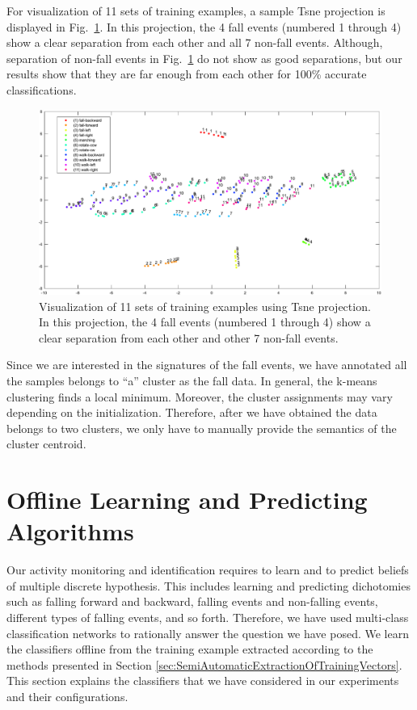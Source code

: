 \documentclass[]{IEEEtran}
\begin{document}
\par
For visualization of 11 sets of training examples, a sample Tsne projection  is displayed in Fig.~\ref{fig:automatic_annotation3}. In this projection, the 4 fall events (numbered 1 through 4) show a clear separation from each other and all 7 non-fall events. Although, separation of non-fall events in Fig.~\ref{fig:automatic_annotation3} do not show as good separations, but our results show that they are far enough from each other for 100\% accurate classifications.

\begin{figure}[!htb]
\centering
\includegraphics[width=.85\textwidth]{figures/viz_all_training_examples_crop2.pdf} 
\caption{Visualization of 11 sets of training examples using Tsne projection. In this projection, the 4 fall events (numbered 1 through 4) show a clear separation from each other and other 7 non-fall events.}
 \label{fig:automatic_annotation3} 
\end{figure}


Since we are 
interested in the signatures of the fall events, we have annotated all the samples belongs 
to ``a'' cluster as the fall data. In general, the k-means clustering finds a 
local minimum. Moreover, the cluster assignments may vary depending on the 
initialization. Therefore, after we have obtained the data belongs to two clusters, we 
only have to manually provide the semantics of the cluster centroid. 

\section{Offline Learning and Predicting Algorithms}
\label{sec:OffLineLearning}


Our activity monitoring and identification requires to learn and to predict beliefs of 
multiple 
discrete hypothesis. This includes learning and predicting dichotomies such as falling 
forward and 
backward, falling events and non-falling events, different types of falling events, and 
so forth. 
Therefore, 
we have used multi-class classification networks to rationally answer the question we 
have posed. We learn the classifiers offline from the training example extracted 
according to the methods presented in Section 
\ref{sec:SemiAutomaticExtractionOfTrainingVectors}. This section explains the classifiers 
that we have considered in our experiments and their configurations. 
\end{document}
